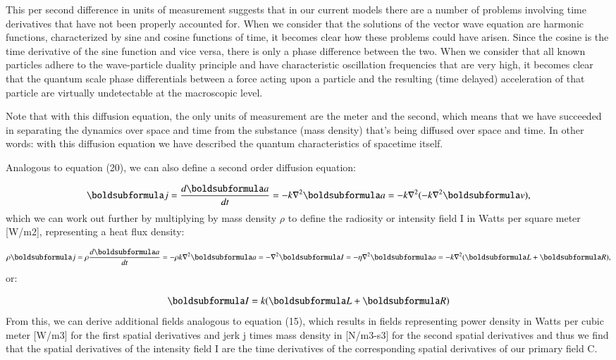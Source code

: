 \documentclass[twoside,final]{article}
\begin{document}
{This per second difference in units of measurement suggests that in our current
models there are a number of problems involving time derivatives that have not
been properly accounted for. When we consider that the solutions of the vector
wave equation are harmonic functions, characterized by sine and cosine functions
of time, it becomes clear how these problems could have arisen. Since the cosine
is the time derivative of the sine function and vice versa, there is only a
phase difference between the two. When we consider that all known particles
adhere to the wave-particle duality principle and have characteristic
oscillation frequencies that are very high, it becomes clear that the quantum
scale phase differentials between a force acting upon a particle and the
resulting (time delayed) acceleration of that particle are virtually
undetectable at the macroscopic level.  

Note that with this diffusion equation, the only units of measurement are the
meter and the second, which means that we have succeeded in separating the
dynamics over space and time from the substance (mass density) that's being
diffused over space and time. In other words: with this diffusion equation we
have described the quantum characteristics of spacetime itself. 

Analogous to equation (20), we can also define a second order diffusion equation:

\begin{equation}
\boldsubformula j=\frac{d\boldsubformula a}{\mathit{dt}}=-k{\nabla}^2\boldsubformula a=-k\nabla ^2(-k\nabla
^2\boldsubformula v),
\end{equation}
which we can work out further by multiplying by mass density $\rho $ to define
the radiosity or intensity field I in Watts per square meter [W/m2],
representing a heat flux density:

\begin{equation}
\rho \boldsubformula j=\rho \frac{d\boldsubformula a}{\mathit{dt}}=-\rho k\nabla ^2\boldsubformula a=-\nabla
^2\boldsubformula I=-\eta \nabla ^2\boldsubformula a=-k\nabla ^2(\boldsubformula L+\boldsubformula R),
\end{equation}
or:

\begin{equation}
\boldsubformula I=k(\boldsubformula L+\boldsubformula R)
\end{equation}
From this, we can derive additional fields analogous to equation (15), which
results in fields representing power density in Watts per cubic meter [W/m3] for
the first spatial derivatives and jerk j times mass density in [N/m3{}-s3] for
the second spatial derivatives and thus we find that the spatial derivatives of
the intensity field I are the time derivatives of the corresponding spatial
derivatives of our primary field C.

}
\end{document}
